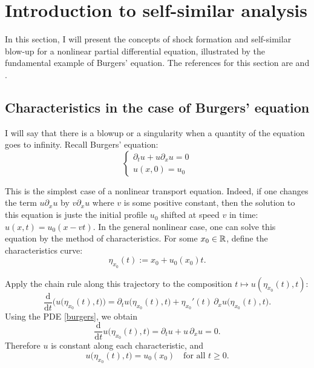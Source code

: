 \documentclass[11pt,a4paper]{article}
\begin{document}
\section{Introduction to self-similar analysis}
In this section, I will present the concepts of shock formation and self-similar blow-up for a nonlinear partial differential equation, illustrated by the fundamental example of Burgers' equation. The references for this section are  \cite{majda2001vorticity} and \cite{eggers2015singularities}.

\subsection{Characteristics in the case of Burgers' equation}
I will say that there is a blowup or a singularity when a quantity of the equation goes to infinity. Recall Burgers' equation:
\label{burgers}
\begin{equation}
\begin{cases} \partial_t u + u\partial_x u = 0 \\ u(x,0)=u_0 \end{cases}
\end{equation}

\noindent This is the simplest case of a nonlinear transport equation. Indeed, if one changes the term $u\partial_x u$ by $v\partial_x u$ where $v$ is some positive constant, then the solution to this equation is juste the initial profile $u_0$ shifted at speed $v$ in time: $u(x,t) = u_0(x - v t)$.
In the general nonlinear case, one can solve this equation by the method of characteristics. For some $x_0\in \mathbb R$, define the characteristics curve:  \[\eta_{x_0}(t) :=x_0+ u_0(x_0)t.\]

\noindent Apply the chain rule along this trajectory to the composition $t\mapsto u(\eta_{x_0}(t),t)$:
\[
\frac{\mathrm{d}}{\mathrm{d}t} \Big(u\big(\eta_{x_0}(t),t\big)\Big)
=\partial_t u\big(\eta_{x_0}(t),t\big)+\eta_{x_0}'(t)\,\partial_x u\big(\eta_{x_0}(t),t\big).
\]
Using the PDE \eqref{burgers}, we obtain
\[
\frac{\mathrm{d}}{\mathrm{d}t}u\big(\eta_{x_0}(t),t\big)
=\partial_t u + u\,\partial_x u = 0.
\]
Therefore $u$ is constant along each characteristic, and
\begin{equation}\label{const_along}
u\big(\eta_{x_0}(t),t\big)=u_0(x_0)\quad\text{for all }t\ge0.
\end{equation}
\end{document}
